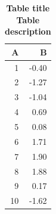 \begin{table}[ht]
\centering
\begin{tabular}{rr}
  \hline
A & B \\ 
  \hline
  1 & -0.40 \\ 
    2 & -1.27 \\ 
    3 & -1.04 \\ 
    4 & 0.69 \\ 
    5 & 0.08 \\ 
    6 & 1.71 \\ 
    7 & 1.90 \\ 
    8 & 1.88 \\ 
    9 & 0.17 \\ 
   10 & -1.62 \\ 
   \hline
\end{tabular}
\caption{\bf{ Table title } Table description} 
\label{tab:rtab1}
\end{table}

